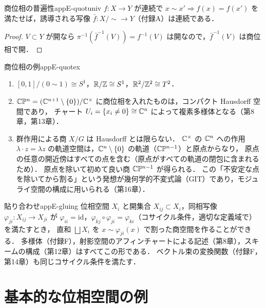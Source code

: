 \begin{myprop}{商位相の普遍性}{appE-quotuniv}
$f\colon X\to Y$ が連続で $x\sim x'\Rightarrow f(x)=f(x')$ を満たせば，誘導される写像 $\bar f\colon X/{\sim}\to Y$（付録A）は連続である．
\end{myprop}
\begin{proof}
$V\subset Y$ が開なら $\pi^{-1}(\bar f^{-1}(V))=f^{-1}(V)$ は開なので，$\bar f^{-1}(V)$ は商位相で開．
\end{proof}

\begin{myex}{商位相の例}{appE-quotex}
\begin{enumerate}
\item $[0,1]/(0\sim1)\cong S^1$，$\mathbb{R}/\mathbb{Z}\cong S^1$，$\mathbb{R}^2/\mathbb{Z}^2\cong T^2$．
\item $\mathbb{C}\mathbb{P}^n=(\mathbb{C}^{n+1}\setminus\{0\})/\mathbb{C}^\times$ に商位相を入れたものは，コンパクト Hausdorff 空間であり，
チャート $U_i=\{x_i\ne0\}\cong\mathbb{C}^n$ によって複素多様体となる（第8章，第13章）．
\item 群作用による商 $X/G$ は Hausdorff とは限らない．
$\mathbb{C}^\times$ の $\mathbb{C}^n$ への作用 $\lambda\cdot z=\lambda z$ の軌道空間は，$\mathbb{C}^n\setminus\{0\}$ の軌道（$\mathbb{C}\mathbb{P}^{n-1}$）と原点からなり，
原点の任意の開近傍はすべての点を含む（原点がすべての軌道の閉包に含まれるため）．
原点を除いて初めて良い商 $\mathbb{C}\mathbb{P}^{n-1}$ が得られる．
この「不安定な点を除いてから割る」という発想が幾何学的不変式論（GIT）であり，モジュライ空間の構成に用いられる（第16章）．
\end{enumerate}
\end{myex}

\begin{myex}{貼り合わせ}{appE-gluing}
位相空間 $X_i$ と開集合 $X_{ij}\subset X_i$，同相写像 $\varphi_{ji}\colon X_{ij}\to X_{ji}$ が
$\varphi_{ii}=\mathrm{id}$，$\varphi_{kj}\circ\varphi_{ji}=\varphi_{ki}$（コサイクル条件，適切な定義域で）を満たすとき，
直和 $\bigsqcup X_i$ を $x\sim\varphi_{ji}(x)$ で割った商空間を作ることができる．
多様体（付録F），射影空間のアフィンチャートによる記述（第8章），スキームの構成（第12章）はすべてこの形である．
ベクトル束の変換関数（付録F，第14章）も同じコサイクル条件を満たす．
\end{myex}

\section{基本的な位相空間の例}

